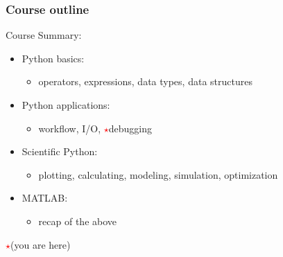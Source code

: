 \documentclass[11pt]{beamer}
\newcommand{\correctstar}{\textcolor{red}{$\star$}}
\begin{document}

\begin{frame}
  \frametitle{Course outline}
  \Enlarge

  Course Summary:
  \begin{itemize}
  \item  Python basics:
    \begin{itemize}
    \item  operators, expressions, data types, data structures
    \end{itemize}
  \item  Python applications:
    \begin{itemize}
    \item  workflow, I/O, \correctstar debugging
    \end{itemize}
  \item  Scientific Python:
    \begin{itemize}
    \item  plotting, calculating, modeling, simulation, optimization
    \end{itemize}
  \item  MATLAB:
    \begin{itemize}
    \item  recap of the above
    \end{itemize}
  \end{itemize}

  \correctstar (you are here)
\end{frame}

\end{document}
